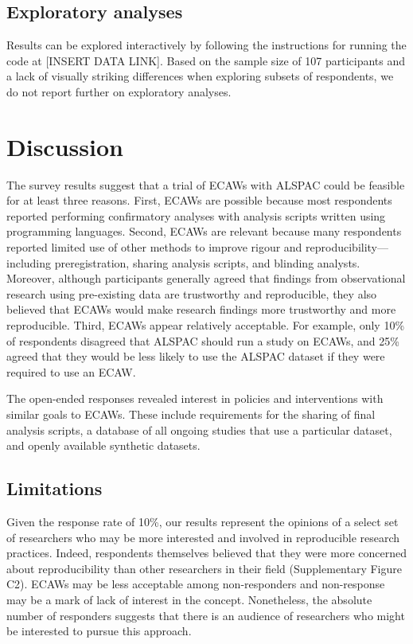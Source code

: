 \documentclass[
  man,floatsintext]{apa6}
\begin{document}
\pagebreak

\hypertarget{exploratory-analyses}{%
\subsection{Exploratory analyses}\label{exploratory-analyses}}

Results can be explored interactively by following the instructions for running the code at {[}INSERT DATA LINK{]}. Based on the sample size of 107 participants and a lack of visually striking differences when exploring subsets of respondents, we do not report further on exploratory analyses.

\hypertarget{discussion}{%
\section{Discussion}\label{discussion}}

The survey results suggest that a trial of ECAWs with ALSPAC could be feasible for at least three reasons. First, ECAWs are possible because most respondents reported performing confirmatory analyses with analysis scripts written using programming languages. Second, ECAWs are relevant because many respondents reported limited use of other methods to improve rigour and reproducibility---including preregistration, sharing analysis scripts, and blinding analysts. Moreover, although participants generally agreed that findings from observational research using pre-existing data are trustworthy and reproducible, they also believed that ECAWs would make research findings more trustworthy and more reproducible. Third, ECAWs appear relatively acceptable. For example, only 10\% of respondents disagreed that ALSPAC should run a study on ECAWs, and 25\% agreed that they would be less likely to use the ALSPAC dataset if they were required to use an ECAW.

The open-ended responses revealed interest in policies and interventions with similar goals to ECAWs. These include requirements for the sharing of final analysis scripts, a database of all ongoing studies that use a particular dataset, and openly available synthetic datasets.

\hypertarget{limitations}{%
\subsection{Limitations}\label{limitations}}

Given the response rate of 10\%, our results represent the opinions of a select set of researchers who may be more interested and involved in reproducible research practices. Indeed, respondents themselves believed that they were more concerned about reproducibility than other researchers in their field (Supplementary Figure C2). ECAWs may be less acceptable among non-responders and non-response may be a mark of lack of interest in the concept. Nonetheless, the absolute number of responders suggests that there is an audience of researchers who might be interested to pursue this approach.
\end{document}

